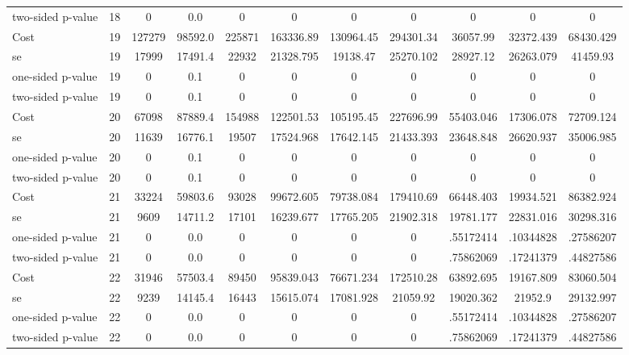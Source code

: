 \begin{tabular}{lcccccccccc}
two-sided p-value &       18 &         0 &       0.0 &         0 & 0 & 0 & 0 & 0 & 0 & 0 \\  
Cost 			  &        19 &    127279 &   98592.0 &    225871 & 163336.89 & 130964.45 & 294301.34 & 36057.99 & 32372.439 & 68430.429 \\  
se 				 &        19 &     17999 &   17491.4 &     22932 & 21328.795 & 19138.47 & 25270.102 & 28927.12 & 26263.079 & 41459.93 \\  
one-sided p-value&        19 &         0 &       0.1 &         0 & 0 & 0 & 0 & 0 & 0 & 0 \\  
two-sided p-value&        19 &         0 &       0.1 &         0 & 0 & 0 & 0 & 0 & 0 & 0 \\  
Cost 			  &        20 &     67098 &   87889.4 &    154988 & 122501.53 & 105195.45 & 227696.99 & 55403.046 & 17306.078 & 72709.124 \\  
se 				 &        20 &     11639 &   16776.1 &     19507 & 17524.968 & 17642.145 & 21433.393 & 23648.848 & 26620.937 & 35006.985 \\  
one-sided p-value&        20 &         0 &       0.1 &         0 & 0 & 0 & 0 & 0 & 0 & 0 \\  
two-sided p-value&        20 &         0 &       0.1 &         0 & 0 & 0 & 0 & 0 & 0 & 0 \\  
 Cost 			  &        21 &     33224 &   59803.6 &     93028 & 99672.605 & 79738.084 & 179410.69 & 66448.403 & 19934.521 & 86382.924 \\  
 se 				 &    21 &      9609 &   14711.2 &     17101 & 16239.677 & 17765.205 & 21902.318 & 19781.177 & 22831.016 & 30298.316 \\  
 one-sided p-value&       21 &         0 &       0.0 &         0 & 0 & 0 & 0 & .55172414 & .10344828 & .27586207 \\  
 two-sided p-value&       21 &         0 &       0.0 &         0 & 0 & 0 & 0 & .75862069 & .17241379 & .44827586 \\  
 Cost 			  &        22 &     31946 &   57503.4 &     89450 & 95839.043 & 76671.234 & 172510.28 & 63892.695 & 19167.809 & 83060.504 \\  
 se 				 &    22 &      9239 &   14145.4 &     16443 & 15615.074 & 17081.928 & 21059.92 & 19020.362 & 21952.9 & 29132.997 \\  
 one-sided p-value&       22 &         0 &       0.0 &         0 & 0 & 0 & 0 & .55172414 & .10344828 & .27586207 \\  
 two-sided p-value&       22 &         0 &       0.0 &         0 & 0 & 0 & 0 & .75862069 & .17241379 & .44827586 \\  

\end{tabular}
